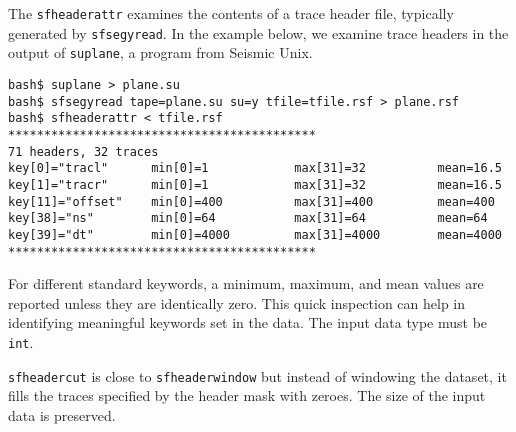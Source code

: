 \noindent\doublebox{\parbox{\textwidth}{

}}

The \texttt{sfheaderattr} examines the contents of a trace header file,
typically generated by \texttt{sfsegyread}. In the example below, we examine
trace headers in the output of \texttt{suplane}, a program from Seismic Unix.
\begin{verbatim}
bash$ suplane > plane.su
bash$ sfsegyread tape=plane.su su=y tfile=tfile.rsf > plane.rsf
bash$ sfheaderattr < tfile.rsf
*******************************************
71 headers, 32 traces
key[0]="tracl"      min[0]=1            max[31]=32          mean=16.5
key[1]="tracr"      min[0]=1            max[31]=32          mean=16.5
key[11]="offset"    min[0]=400          max[31]=400         mean=400
key[38]="ns"        min[0]=64           max[31]=64          mean=64
key[39]="dt"        min[0]=4000         max[31]=4000        mean=4000
*******************************************
\end{verbatim}
For different standard keywords, a minimum, maximum, and mean values
are reported unless they are identically zero.  This quick inspection
can help in identifying meaningful keywords set in the data. The input
data type must be \texttt{int}.


\noindent\doublebox{\parbox{\textwidth}{
    
  }}

\texttt{sfheadercut} is close to \texttt{sfheaderwindow} but instead
of windowing the dataset, it fills the traces specified by the header
mask with zeroes. The size of the input data is preserved.

